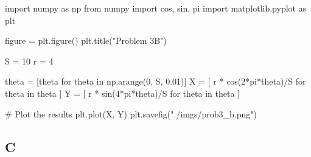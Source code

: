 \documentclass{article}
\begin{document}
\begin{python}
import numpy as np
from numpy import cos, sin, pi
import matplotlib.pyplot as plt

figure = plt.figure()
plt.title("Problem 3B")

S = 10
r = 4

theta = [theta for theta in np.arange(0, S, 0.01)]
X = [
        r * cos(2*pi*theta)/S
        for theta in theta
    ]
Y = [
        r * sin(4*pi*theta)/S
        for theta in theta
    ]

# Plot the results
plt.plot(X, Y)
plt.savefig("./imgs/prob3_b.png")
\end{python}

\subsection*{C}
\end{document}
